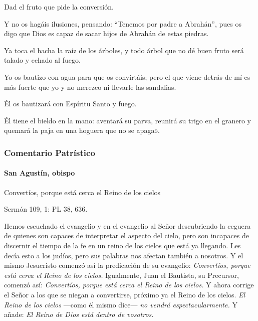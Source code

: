 \documentclass[]{article}
\let\oldparagraph\paragraph
\renewcommand{\paragraph}[1]{\oldparagraph{#1}\mbox{}}
\begin{document}
Dad el fruto que pide la conversión.

Y no os hagáis ilusiones, pensando: ``Tenemos por padre a Abrahán'',
pues os digo que Dios es capaz de sacar hijos de Abrahán de estas
piedras.

Ya toca el hacha la raíz de los árboles, y todo árbol que no dé buen
fruto será talado y echado al fuego.

Yo os bautizo con agua para que os convirtáis; pero el que viene detrás
de mí es más fuerte que yo y no merezco ni llevarle las sandalias.

Él os bautizará con Espíritu Santo y fuego.

Él tiene el bieldo en la mano: aventará su parva, reunirá su trigo en el
granero y quemará la paja en una hoguera que no se
apaga».\protect\hypertarget{_Toc448662722}{}{\protect\hypertarget{_Toc448690241}{}{\protect\hypertarget{_Toc448708264}{}{\protect\hypertarget{_Toc448709350}{}{\protect\hypertarget{_Toc449554352}{}{}}}}}

\subsubsection{Comentario Patrístico}\label{comentario-patruxedstico-1}

\paragraph{San Agustín, obispo}\label{san-agustuxedn-obispo}

Convertíos, porque está cerca el Reino de los cielos

Sermón 109, 1: PL 38, 636.

Hemos escuchado el evangelio y en el evangelio al Señor descubriendo la
ceguera de quienes son capaces de interpretar el aspecto del cielo, pero
son incapaces de discernir el tiempo de la fe en un reino de los cielos
que está ya llegando. Les decía esto a los judíos, pero sus palabras nos
afectan también a nosotros. Y el mismo Jesucristo comenzó así la
predicación de su evangelio: \emph{Convertíos, porque está cerca el
Reino de los cielos.} Igualmente, Juan el Bautista, su Precursor,
comenzó así: \emph{Convertíos, porque está cerca el Reino de los
cielos.} Y ahora corrige el Señor a los que se niegan a convertirse,
próximo ya el Reino de los cielos. \emph{El Reino de los cielos} ---como
él mismo dice--- \emph{no vendrá espectacularmente.} Y añade: \emph{El
Reino de Dios está dentro de vosotros.}
\end{document}

